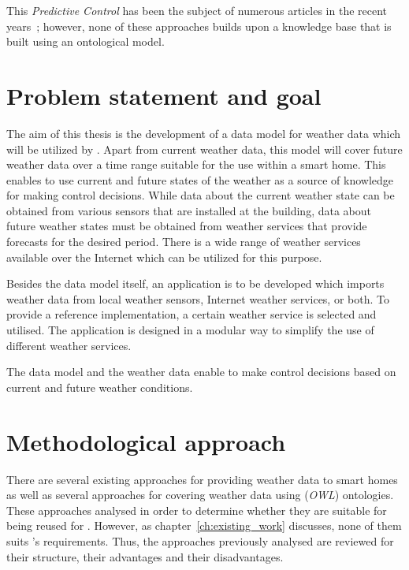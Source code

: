 This \emph{Predictive Control} has been the subject of numerous articles in the recent years~\cite{predictive_control1,predictive_control2,predictive_control3}; however, none of these approaches builds upon a knowledge base that is built using an ontological model.

\section{Problem statement and goal}

The aim of this thesis is the development of a data model for weather data which will be utilized by \thinkhome. Apart from current weather data, this model will cover future weather data over a time range suitable for the use within a smart home. This enables \thinkhome to use current and future states of the weather as a source of knowledge for making control decisions. While data about the current weather state can be obtained from various sensors that are installed at the building, data about future weather states must be obtained from weather services that provide forecasts for the desired period. There is a wide range of weather services available over the Internet which can be utilized for this purpose.

Besides the data model itself, an application is to be developed which imports weather data from local weather sensors, Internet weather services, or both. To provide a reference implementation, a certain weather service is selected and utilised. The application is designed in a modular way to simplify the use of different weather services.

The data model and the weather data enable \thinkhome to make control decisions based on current and future weather conditions.

\section{Methodological approach}

There are several existing approaches for providing weather data to smart homes as well as several approaches for covering weather data using (\emph{OWL}) ontologies. These approaches analysed in order to determine whether they are suitable for being reused for \thinkhome. However, as chapter~\ref{ch:existing_work} discusses, none of them suits \thinkhome's requirements. Thus, the approaches previously analysed are reviewed for their structure, their advantages and their disadvantages.

